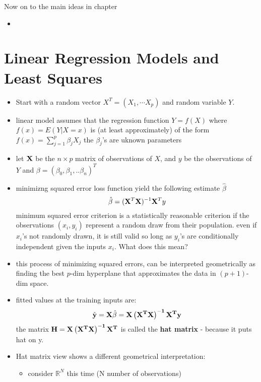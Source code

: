 Now on to the main ideas in chapter
\begin{itemize}
  \item 
\end{itemize}

\setcounter{section}{1}
\section{Linear Regression Models and Least Squares}
\begin{itemize}
  \item Start with a random vector $X^T = (X_1, \cdots X_p)$ and random variable $Y$.
  \item linear model assumes that the regression function $Y = f(X)$ where $f(x) = E(Y|X=x)$ is (at least approximately) of the form  $f(x) = \sum_{j=1}^p \beta_j X_j$
    \subitem the $\beta_j$'s are uknown parameters
  \item let ${\bf X}$ be the $n\times p$ matrix of observations of $X$, and $y$ be the observations of $Y$ and $\beta = (\beta_0, \beta_1,..\beta_n)^T$
  \item minimizng squared error loss function yield the following estimate $\hat{\beta}$ 
    $$ \hat{\beta} = ({\bf X}^T {\bf X})^{-1} {\bf X}^T y $$
    \subitem minimum squared error criterion is a statistically reasonable criterion if the observations $(x_i, y_i)$ represent a random draw from their population.
    \subitem even if $x_i$'s not randomly drawn, it is still valid so long as $y_i$'s are conditionally independent given the inputs $x_i$. {\red What does this mean?}
  \item this process of minimizing squared errors, can be interpreted geometrically as finding the best $p$-dim hyperplane that approximates the data in $(p+1)$-dim space.
  \item fitted values at the training inputs are:
    $$ \hat{\bf y} = {\bf X}\hat{\beta} = {\bf X \left(X^T X\right)^{-1} X^T y} $$
    \subitem the matrix ${\bf H = X \left(X^T X\right)^{-1} X^T } $ is called the {\bf hat matrix} - because it puts hat on y.
  \item Hat matrix view shows a different geometrical interpretation:
    \begin{itemize}
      \item consider $\mathbb{R}^N$ this time (N number of observations)

\end{itemize}
\end{itemize}
